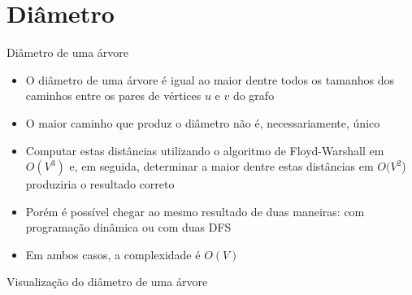 \section{Diâmetro}

\begin{frame}[fragile]{Diâmetro de uma árvore}

    \begin{itemize}
        \item O diâmetro de uma árvore é igual ao maior dentre todos os tamanhos dos caminhos
            entre os pares de vértices $u$ e $v$ do grafo

        \item O maior caminho que produz o diâmetro não é, necessariamente, único

        \item Computar estas distâncias utilizando o algoritmo de Floyd-Warshall em $O(V^3)$ e,
            em seguida, determinar a maior dentre estas distâncias em $O(V^2$) produziria
            o resultado correto

        \item Porém é possível chegar ao mesmo resultado de duas maneiras: com programação
            dinâmica ou com duas DFS

        \item Em ambos casos, a complexidade é $O(V)$

    \end{itemize}

\end{frame}

\begin{frame}[fragile]{Visualização do diâmetro de uma árvore}


\end{frame}

